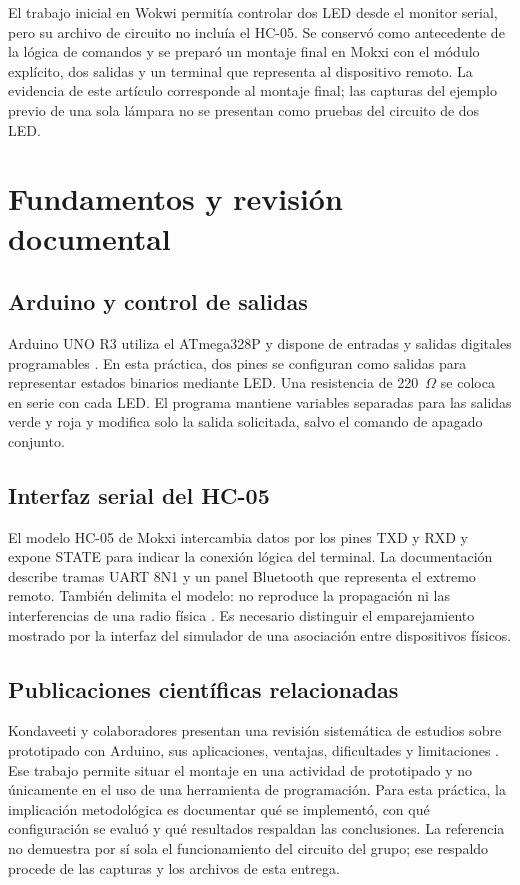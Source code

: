 \documentclass[10pt,a4paper,conference]{IEEEtran}
\begin{document}
El trabajo inicial en Wokwi permitía controlar dos LED desde el monitor serial, pero su archivo de circuito no incluía el HC-05. Se conservó como antecedente de la lógica de comandos y se preparó un montaje final en Mokxi con el módulo explícito, dos salidas y un terminal que representa al dispositivo remoto. La evidencia de este artículo corresponde al montaje final; las capturas del ejemplo previo de una sola lámpara no se presentan como pruebas del circuito de dos LED.

\section{Fundamentos y revisión documental}
\subsection{Arduino y control de salidas}
Arduino UNO R3 utiliza el ATmega328P y dispone de entradas y salidas digitales programables \cite{uno}. En esta práctica, dos pines se configuran como salidas para representar estados binarios mediante LED. Una resistencia de 220~$\Omega$ se coloca en serie con cada LED. El programa mantiene variables separadas para las salidas verde y roja y modifica solo la salida solicitada, salvo el comando de apagado conjunto.

\subsection{Interfaz serial del HC-05}
El modelo HC-05 de Mokxi intercambia datos por los pines TXD y RXD y expone STATE para indicar la conexión lógica del terminal. La documentación describe tramas UART 8N1 y un panel Bluetooth que representa el extremo remoto. También delimita el modelo: no reproduce la propagación ni las interferencias de una radio física \cite{modelo}. Es necesario distinguir el emparejamiento mostrado por la interfaz del simulador de una asociación entre dispositivos físicos.

\subsection{Publicaciones científicas relacionadas}
Kondaveeti y colaboradores presentan una revisión sistemática de estudios sobre prototipado con Arduino, sus aplicaciones, ventajas, dificultades y limitaciones \cite{kondaveeti}. Ese trabajo permite situar el montaje en una actividad de prototipado y no únicamente en el uso de una herramienta de programación. Para esta práctica, la implicación metodológica es documentar qué se implementó, con qué configuración se evaluó y qué resultados respaldan las conclusiones. La referencia no demuestra por sí sola el funcionamiento del circuito del grupo; ese respaldo procede de las capturas y los archivos de esta entrega.
\end{document}
